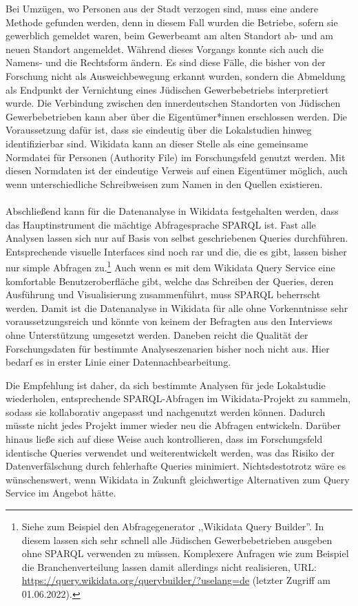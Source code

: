 Bei Umzügen, wo Personen aus der Stadt verzogen sind, muss eine andere Methode gefunden werden, denn in diesem Fall wurden die Betriebe, sofern sie gewerblich gemeldet waren, beim Gewerbeamt am alten Standort ab- und am neuen Standort angemeldet. Während dieses Vorgangs konnte sich auch die Namens- und die Rechtsform ändern. Es sind diese Fälle, die bisher von der Forschung nicht als Ausweichbewegung erkannt wurden, sondern die Abmeldung als Endpunkt der Vernichtung eines Jüdischen Gewerbebetriebs interpretiert wurde. Die Verbindung zwischen den innerdeutschen Standorten von Jüdischen Gewerbebetrieben kann aber über die Eigentümer*innen erschlossen werden. Die Voraussetzung dafür ist, dass sie eindeutig über die Lokalstudien hinweg identifizierbar sind. Wikidata kann an dieser Stelle als eine gemeinsame Normdatei für Personen (Authority File) im Forschungsfeld genutzt werden. Mit diesen Normdaten ist der eindeutige Verweis auf einen Eigentümer möglich, auch wenn unterschiedliche Schreibweisen zum Namen in den Quellen existieren. \\ \\
Abschließend kann für die Datenanalyse in Wikidata festgehalten werden, dass das Hauptinstrument die mächtige Abfragesprache SPARQL ist. Fast alle Analysen lassen sich nur auf Basis von selbst geschriebenen Queries durchführen. Entsprechende visuelle Interfaces sind noch rar und die, die es gibt, lassen bisher nur simple Abfragen zu.\footnote{Siehe zum Beispiel den Abfragegenerator ,,Wikidata Query Builder''. In diesem lassen sich sehr schnell alle Jüdischen Gewerbebetrieben ausgeben ohne SPARQL verwenden zu müssen. Komplexere Anfragen wie zum Beispiel die Branchenverteilung lassen damit allerdings nicht realisieren, URL: \url{https://query.wikidata.org/querybuilder/?uselang=de} (letzter Zugriff am 01.06.2022).} Auch wenn es mit dem Wikidata Query Service eine komfortable Benutzeroberfläche gibt, welche das Schreiben der Queries, deren Ausführung und Visualisierung zusammenführt, muss SPARQL beherrscht werden. Damit ist die Datenanalyse in Wikidata für alle ohne Vorkenntnisse sehr voraussetzungsreich und könnte von keinem der Befragten aus den Interviews ohne Unterstützung umgesetzt werden. Daneben reicht die Qualität der Forschungsdaten für bestimmte Analyseszenarien bisher noch nicht aus. Hier bedarf es in erster Linie einer Datennachbearbeitung.

Die Empfehlung ist daher, da sich bestimmte Analysen für jede Lokalstudie wiederholen, entsprechende SPARQL-Abfragen im Wikidata-Projekt zu sammeln, sodass sie kollaborativ angepasst und nachgenutzt werden können. Dadurch müsste nicht jedes Projekt immer wieder neu die Abfragen entwickeln. Darüber hinaus ließe sich auf diese Weise auch kontrollieren, dass im Forschungsfeld identische Queries verwendet und weiterentwickelt werden, was das Risiko der Datenverfälschung durch fehlerhafte Queries minimiert. Nichtsdestotrotz wäre es wünschenswert, wenn Wikidata in Zukunft gleichwertige Alternativen zum Query Service im Angebot hätte.
  
